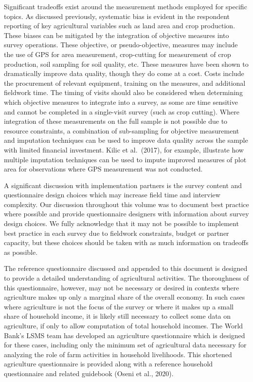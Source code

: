 \documentclass[
]{book}
\begin{document}
Significant tradeoffs exist around the measurement methods employed for specific topics. As discussed previously, systematic bias is evident in the respondent reporting of key agricultural variables such as land area and crop production. These biases can be mitigated by the integration of objective measures into survey operations. These objective, or pseudo-objective, measures may include the use of GPS for area measurement, crop-cutting for measurement of crop production, soil sampling for soil quality, etc. These measures have been shown to dramatically improve data quality, though they do come at a cost. Costs include the procurement of relevant equipment, training on the measures, and additional fieldwork time. The timing of visits should also be considered when determining which objective measures to integrate into a survey, as some are time sensitive and cannot be completed in a single-visit survey (such as crop cutting). Where integration of these measurements on the full sample is not possible due to resource constraints, a combination of sub-sampling for objective measurement and imputation techniques can be used to improve data quality across the sample with limited financial investment. Kilic et al.~(2017), for example, illustrate how multiple imputation techniques can be used to impute improved measures of plot area for observations where GPS measurement was not conducted.

A significant discussion with implementation partners is the survey content and questionnaire design choices which may increase field time and interview complexity. Our discussion throughout this volume was to document best practice where possible and provide questionnaire designers with information about survey design choices. We fully acknowledge that it may not be possible to implement best practice in each survey due to fieldwork constraints, budget or partner capacity, but these choices should be taken with as much information on tradeoffs as possible.

The reference questionnaire discussed and appended to this document is designed to provide a detailed understanding of agricultural activities. The thoroughness of this questionnaire, however, may not be necessary or desired in contexts where agriculture makes up only a marginal share of the overall economy. In such cases where agriculture is not the focus of the survey or where it makes up a small share of household income, it is likely still necessary to collect some data on agriculture, if only to allow computation of total household incomes. The World Bank's LSMS team has developed an agriculture questionnaire which is designed for these cases, including only the minimum set of agricultural data necessary for analyzing the role of farm activities in household livelihoods. This shortened agriculture questionnaire is provided along with a reference household questionnaire and related guidebook (Oseni et al., 2020).
\end{document}
